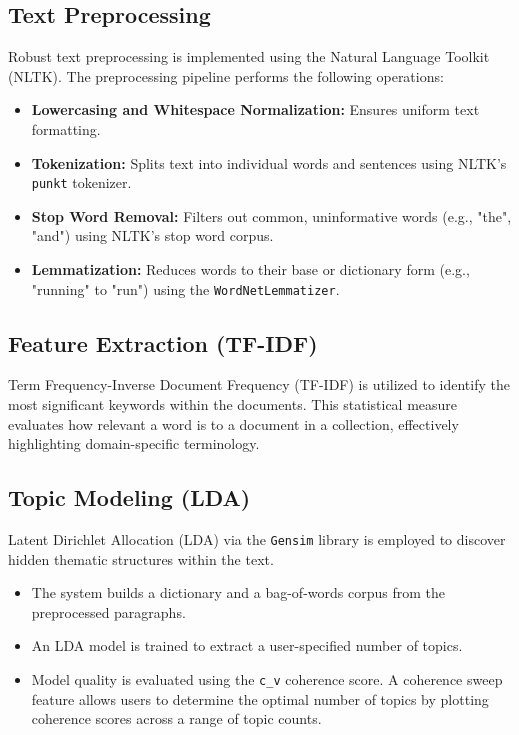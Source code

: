 \documentclass[12pt, a4paper]{article}
\begin{document}
\subsection{Text Preprocessing}
Robust text preprocessing is implemented using the Natural Language Toolkit (NLTK). The preprocessing pipeline performs the following operations:
\begin{itemize}
    \item \textbf{Lowercasing and Whitespace Normalization:} Ensures uniform text formatting.
    \item \textbf{Tokenization:} Splits text into individual words and sentences using NLTK's \texttt{punkt} tokenizer.
    \item \textbf{Stop Word Removal:} Filters out common, uninformative words (e.g., "the", "and") using NLTK's stop word corpus.
    \item \textbf{Lemmatization:} Reduces words to their base or dictionary form (e.g., "running" to "run") using the \texttt{WordNetLemmatizer}.
\end{itemize}

\subsection{Feature Extraction (TF-IDF)}
Term Frequency-Inverse Document Frequency (TF-IDF) is utilized to identify the most significant keywords within the documents. This statistical measure evaluates how relevant a word is to a document in a collection, effectively highlighting domain-specific terminology.

\subsection{Topic Modeling (LDA)}
Latent Dirichlet Allocation (LDA) via the \texttt{Gensim} library is employed to discover hidden thematic structures within the text. 
\begin{itemize}
    \item The system builds a dictionary and a bag-of-words corpus from the preprocessed paragraphs.
    \item An LDA model is trained to extract a user-specified number of topics.
    \item Model quality is evaluated using the \texttt{c\_v} coherence score. A coherence sweep feature allows users to determine the optimal number of topics by plotting coherence scores across a range of topic counts.
\end{itemize}
\end{document}
